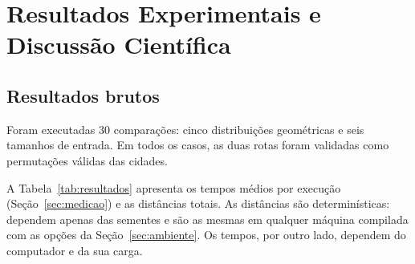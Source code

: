 \documentclass[11pt,a4paper]{article}
\renewcommand{\_}{\underscoreoriginal\allowbreak}
\begin{document}
\section{Resultados Experimentais e Discussão Científica}
\label{sec:resultados}

\subsection{Resultados brutos}

Foram executadas 30 comparações: cinco distribuições geométricas e seis
tamanhos de entrada. Em todos os casos, as duas rotas foram validadas
como permutações válidas das cidades.

A Tabela~\ref{tab:resultados} apresenta os tempos médios por execução
(Seção~\ref{sec:medicao}) e as distâncias totais. As distâncias são
determinísticas: dependem apenas das sementes e são as mesmas em
qualquer máquina compilada com as opções da Seção~\ref{sec:ambiente}.
Os tempos, por outro lado, dependem do computador e da sua carga.
\end{document}
